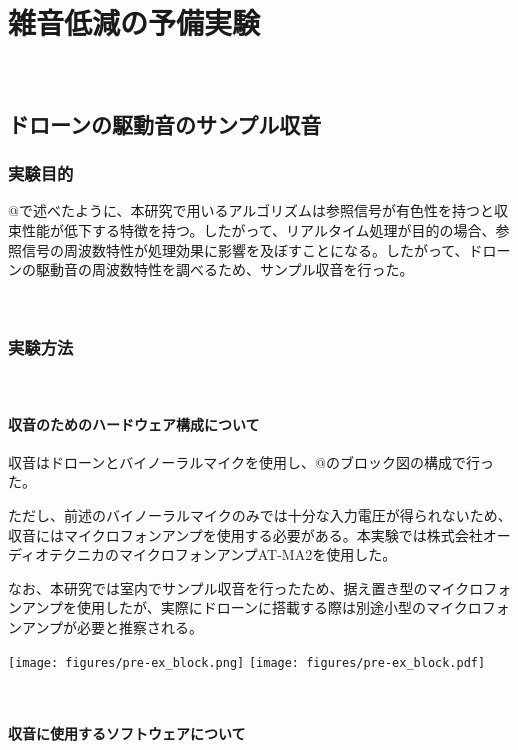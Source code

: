 \
\chapter{雑音低減の予備実験}\label{noise-pre-experiment}

\
\section{ドローンの駆動音のサンプル収音}\label{record-drone}

\subsection{実験目的}\label{purpose-drone}

@で述べたように、本研究で用いるアルゴリズムは参照信号が有色性を持つと収束性能が低下する特徴を持つ。したがって、リアルタイム処理が目的の場合、参照信号の周波数特性が処理効果に影響を及ぼすことになる。したがって、ドローンの駆動音の周波数特性を調べるため、サンプル収音を行った。

\
\subsection{実験方法}\label{instruction-drone}

\
\subsubsection{収音のためのハードウェア構成について}\label{hardware-for-record}

収音はドローンとバイノーラルマイクを使用し、@のブロック図の構成で行った。

ただし、前述のバイノーラルマイクのみでは十分な入力電圧が得られないため、収音にはマイクロフォンアンプを使用する必要がある。本実験では株式会社オーディオテクニカのマイクロフォンアンプAT-MA2を使用した。

なお、本研究では室内でサンプル収音を行ったため、据え置き型のマイクロフォンアンプを使用したが、実際にドローンに搭載する際は別途小型のマイクロフォンアンプが必要と推察される。

\texttt{[image: figures/pre-ex\_block.png]}
\texttt{[image: figures/pre-ex\_block.pdf]}

\
\subsubsection{収音に使用するソフトウェアについて}\label{software-for-record}

